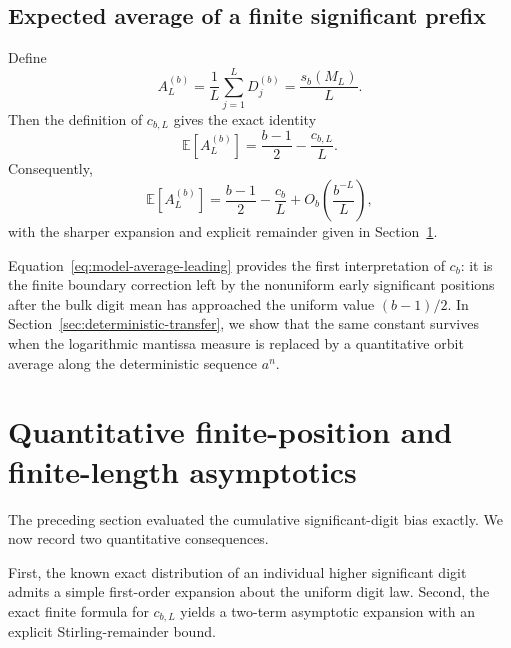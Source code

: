 \documentclass[11pt]{article}
\theoremstyle{definition}
\theoremstyle{remark}
\begin{document}
\subsection{Expected average of a finite significant prefix}
\label{subsec:model-average}

Define
\begin{equation}
    A_L^{(b)}
    =
    \frac1L
    \sum_{j=1}^{L}D_j^{(b)}
    =
    \frac{s_b(M_L)}{L}.
    \label{eq:A-L-base-b}
\end{equation}
Then the definition of \(c_{b,L}\) gives the exact identity
\begin{equation}
\boxed{
    \mathbb E[A_L^{(b)}]
    =
    \frac{b-1}{2}
    -
    \frac{c_{b,L}}{L}.
}
\label{eq:model-average-exact}
\end{equation}
Consequently,
\begin{equation}
    \mathbb E[A_L^{(b)}]
    =
    \frac{b-1}{2}
    -
    \frac{c_b}{L}
    +
    O_b\!\left(\frac{b^{-L}}{L}\right),
    \label{eq:model-average-leading}
\end{equation}
with the sharper expansion and explicit remainder given in
Section~\ref{sec:quantitative-asymptotics}.

Equation~\eqref{eq:model-average-leading} provides the first
interpretation of \(c_b\): it is the finite boundary correction left
by the nonuniform early significant positions after the bulk digit
mean has approached the uniform value \((b-1)/2\).
In Section~\ref{sec:deterministic-transfer}, we show that the same
constant survives when the logarithmic mantissa measure is replaced
by a quantitative orbit average along the deterministic sequence
\(a^n\).


\section{Quantitative finite-position and finite-length asymptotics}
\label{sec:quantitative-asymptotics}

The preceding section evaluated the cumulative significant-digit bias
exactly.  We now record two quantitative consequences.

First, the known exact distribution of an individual higher significant
digit admits a simple first-order expansion about the uniform digit law.
Second, the exact finite formula for \(c_{b,L}\) yields a two-term
asymptotic expansion with an explicit Stirling-remainder bound.
\end{document}
